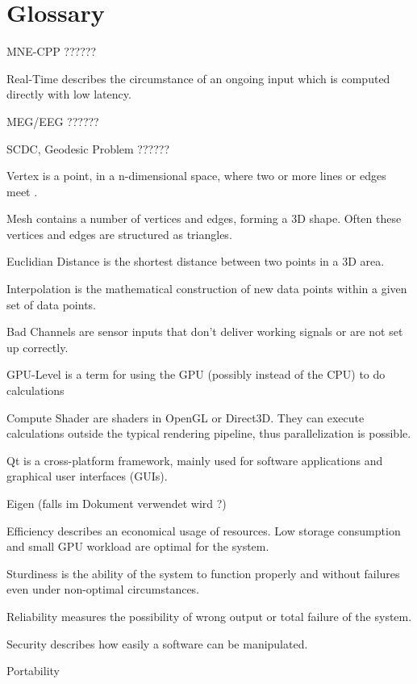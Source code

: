 \section{Glossary}

\begin{aims}
	
	\item[MNE-CPP ??????]
	\item[Real-Time] describes the circumstance of an ongoing input which is computed directly with low latency.
	
	\item[MEG/EEG ??????] %
	\item[SCDC, Geodesic Problem ??????]
	\item[Vertex] is a point, in a n-dimensional space, where two or more lines or edges meet .
	\item[Mesh]	contains a number of vertices and edges, forming a 3D shape. Often these vertices and edges are structured as 					triangles.	
	\item[Euclidian Distance] is the shortest distance between two points in a 3D area.
	\item[Interpolation] is the mathematical construction of new data points within a given set of data points.
	\item[Bad Channels] are sensor inputs that don't deliver working signals or are not set up correctly.
	\item[GPU-Level] is a term for using the GPU (possibly instead of the CPU) to do calculations
	\item[Compute Shader] are shaders in OpenGL or Direct3D.%
	 They can execute calculations outside the typical rendering 								  pipeline, thus parallelization is possible.
	\item[Qt] is a cross-platform framework, mainly used for software applications and graphical user interfaces (GUIs). 
	\item[Eigen (falls im Dokument verwendet wird ?)]
	\item[Efficiency] describes an economical usage of resources. Low storage consumption and small GPU workload are optimal 					  	  for the system.
	\item[Sturdiness] is the ability of the system to function properly and without failures even under non-optimal 								  circumstances. 
	\item[Reliability] measures the possibility of wrong output or total failure of the system.
	\item[Security] describes how easily a software can be manipulated.
	\item[Portability]  

\end{aims}